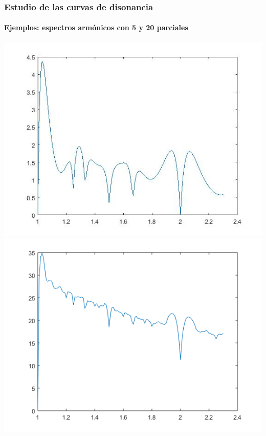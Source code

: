 \documentclass[12 pt]{beamer}
\begin{document}
\begin{frame}{21}
    \frametitle{Estudio de las curvas de disonancia}
    
    \framesubtitle{Ejemplos: espectros armónicos con 5 y 20 parciales}
    
    \begin{center}
        \includegraphics[scale = .3]{Espectro1_5}
        \includegraphics[scale = .4]{Espectro1-20}
    \end{center}
    
\end{frame}
\end{document}
